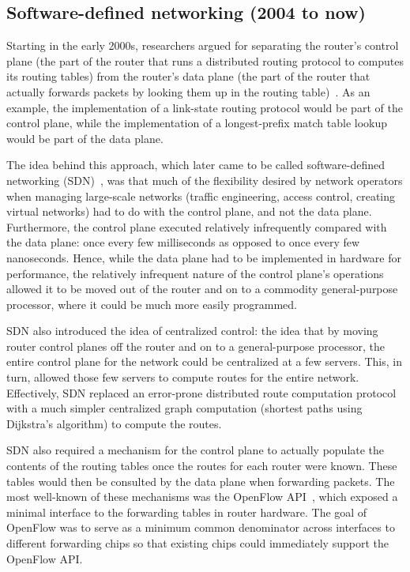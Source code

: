 
\subsection{Software-defined networking (2004 to now)}
Starting in the early 2000s, researchers argued for separating the router's
control plane (\ie the part of the router that runs a distributed routing
protocol to computes its routing tables) from the router's data plane (\ie the
part of the router that actually forwards packets by looking them up in the
routing table)~\cite{route_control, case_for, forces, fourd, ethane}. As an example, the
implementation of a link-state routing protocol would be part of the control
plane, while the implementation of a longest-prefix match table lookup would be
part of the data plane.

The idea behind this approach, which later came to be called software-defined
networking (SDN)~\cite{sdn_coining}, was that much of the flexibility desired
by network operators when managing large-scale networks (\eg traffic
engineering, access control, creating virtual networks) had to do with the
control plane, and not the data plane.  Furthermore, the control plane executed
relatively infrequently compared with the data plane: once every few
milliseconds as opposed to once every few nanoseconds. Hence, while the data
plane had to be implemented in hardware for performance, the relatively
infrequent nature of the control plane's operations allowed it to be moved out
of the router and on to a commodity general-purpose processor, where it could
be much more easily programmed.

SDN also introduced the idea of centralized control: the idea that by moving
router control planes off the router and on to a general-purpose processor, the
entire control plane for the network could be centralized at a few servers.
This, in turn, allowed those few servers to compute routes for the entire
network. Effectively, SDN replaced an error-prone distributed route computation
protocol with a much simpler centralized graph computation (\eg shortest paths
using Dijkstra's algorithm) to compute the routes.

SDN also required a mechanism for the control plane to actually populate the
contents of the routing tables once the routes for each router were known.
These tables would then be consulted by the data plane when forwarding packets.
The most well-known of these mechanisms was the OpenFlow API~\cite{openflow},
which exposed a minimal interface to the forwarding tables in router hardware.
The goal of OpenFlow was to serve as a minimum common denominator across
interfaces to different forwarding chips so that existing chips could
immediately support the OpenFlow API.

